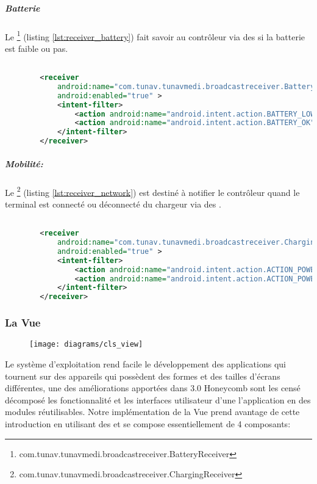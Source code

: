 \subparagraph{Batterie}

Le \footnote{com.tunav.tunavmedi.broadcastreceiver.BatteryReceiver} (listing \ref{lst:receiver_battery}) fait savoir au contrôleur via des  si la batterie est faible ou pas.

\begin{lstlisting}[language=xml, label=lst:receiver_battery, caption=Déclaration dans AndroidManifest du BatteryReceiver.]

        <receiver
            android:name="com.tunav.tunavmedi.broadcastreceiver.BatteryReceiver"
            android:enabled="true" >
            <intent-filter>
                <action android:name="android.intent.action.BATTERY_LOW" />
                <action android:name="android.intent.action.BATTERY_OK" />
            </intent-filter>
        </receiver>

\end{lstlisting}

\subparagraph{Mobilité:}
Le \footnote{com.tunav.tunavmedi.broadcastreceiver.ChargingReceiver} (listing \ref{lst:receiver_network}) est destiné à notifier le contrôleur quand le terminal est connecté ou déconnecté du  chargeur via des .

\begin{lstlisting}[language=xml, label=lst:receiver_charging, caption=Déclaration dans AndroidManifest ChargingReceivers.]

        <receiver
            android:name="com.tunav.tunavmedi.broadcastreceiver.ChargingReceiver"
            android:enabled="true" >
            <intent-filter>
                <action android:name="android.intent.action.ACTION_POWER_CONNECTED" />
                <action android:name="android.intent.action.ACTION_POWER_DISCONNECTED" />
            </intent-filter>
        </receiver>

\end{lstlisting}

\subsubsection{La Vue}

\begin{figure}
\center
\texttt{[image: diagrams/cls\_view]}
\end{figure}

Le système d'exploitation \android{} rend facile le développement des applications qui tournent sur des appareils qui possèdent des formes et des tailles d’écrans différentes, une des améliorations apportées dans \android{} 3.0 Honeycomb sont les  censé décomposé les fonctionnalité et les interfaces utilisateur d'une l'application \android{} en des modules réutilisables. Notre implémentation de la Vue prend avantage de cette introduction en utilisant des  et se compose essentiellement de 4 composants:

